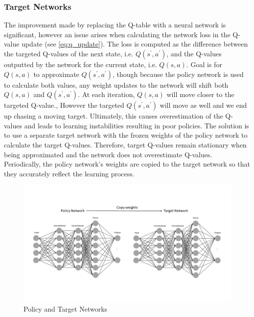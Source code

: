 \documentclass[notitlepage,a4paper,11pt]{article}
\begin{document}
\subsubsection{Target Networks}
The improvement made by replacing the Q-table with a neural network is significant, however an issue arises when calculating the network loss in the Q-value update (see \ref{eq:q_update}). The loss is computed as the difference between the targeted Q-values of the next state, i.e. $Q(s^\prime, a^\prime)$, and the Q-values outputted by the network for the current state, i.e. $Q(s,a)$. Goal is for $Q(s,a)$ to approximate $Q(s^\prime, a^\prime)$, though because the policy network is used to calculate both values, any weight updates to the network will shift both $Q(s,a)$ and $Q(s^\prime, a^\prime)$. At each iteration, $Q(s,a)$ will move closer to the targeted Q-value., However the targeted $Q(s^\prime, a^\prime)$ will move as well and we end up chasing a moving target. Ultimately, this causes overestimation of the Q-values and leads to learning instabilities resulting in poor policies. The solution is to use a separate target network with the frozen weights of the policy network to calculate the target Q-values. Therefore, target Q-values remain stationary when being approximated and the network does not overestimate Q-values. Periodically, the policy network's weights are copied to the target network so that they accurately reflect the learning process.


\begin{figure}[!htb]
\centering
\includegraphics[trim={0 3cm 0 3cm},clip,width=1\linewidth]{figs/policy_target_nn.png}
\caption{Policy and Target Networks} \label{fig:2}
\end{figure}
\end{document}
